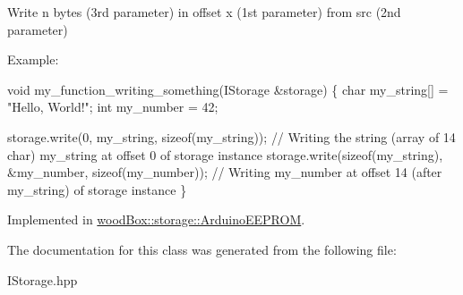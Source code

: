 Write n bytes (3rd parameter) in offset x (1st parameter) from src (2nd parameter)

Example\+:


\begin{DoxyCode}
\textcolor{keywordtype}{void} my\_function\_writing\_something(IStorage &storage) \{
  \textcolor{keywordtype}{char} my\_string[] = \textcolor{stringliteral}{"Hello, World!"};
  \textcolor{keywordtype}{int} my\_number = 42;

  storage.write(0, my\_string, \textcolor{keyword}{sizeof}(my\_string)); \textcolor{comment}{// Writing the string (array of 14 char) my\_string at
       offset 0 of storage instance}
  storage.write(\textcolor{keyword}{sizeof}(my\_string), &my\_number, \textcolor{keyword}{sizeof}(my\_number)); \textcolor{comment}{// Writing my\_number at offset 14 (after
       my\_string) of storage instance}
\}
\end{DoxyCode}
 

Implemented in \mbox{\hyperlink{classwood_box_1_1storage_1_1_arduino_e_e_p_r_o_m_af78d2077806af7e1aac65d6890915d77}{wood\+Box\+::storage\+::\+Arduino\+E\+E\+P\+R\+OM}}.



The documentation for this class was generated from the following file\+:\begin{DoxyCompactItemize}
\item 
I\+Storage.\+hpp\end{DoxyCompactItemize}
